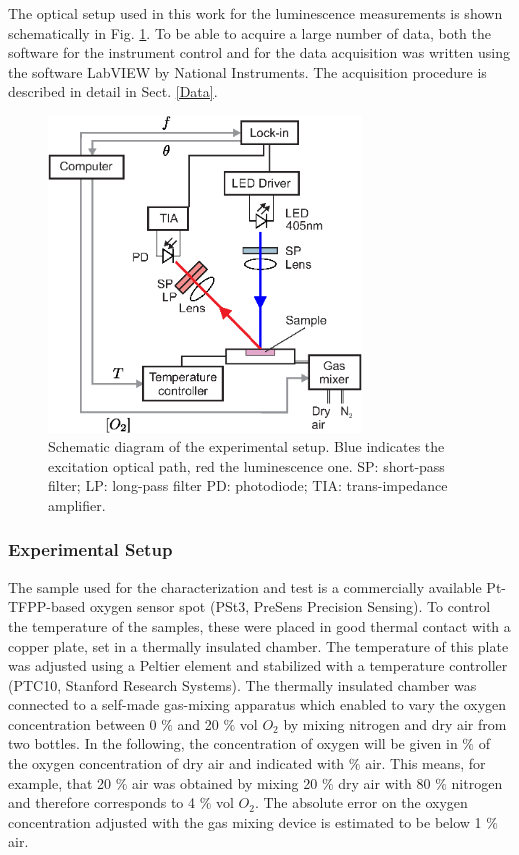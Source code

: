 \documentclass[9pt,twocolumn,twoside,pdftex]{optica}
\begin{document}
The optical setup used in this work for the luminescence measurements is shown schematically in Fig. \ref{fig:setup}. To be able to acquire a large number of data, both the software for the instrument control and for the data acquisition was written using the software LabVIEW by National Instruments. The acquisition procedure is described in detail in Sect. \ref{Data}.

\begin{figure}[t!]
\centering
\includegraphics[keepaspectratio, width=8.3cm]{Setup_auto.eps}
\caption{Schematic diagram of the experimental setup. Blue indicates the excitation optical path, red the luminescence one. SP: short-pass filter; LP: long-pass filter PD: photodiode; TIA: trans-impedance amplifier.}
\label{fig:setup}
\end{figure}


\subsubsection{Experimental Setup}

The sample used for the characterization and test is a commercially available Pt-TFPP-based oxygen sensor spot (PSt3, PreSens Precision Sensing).
To control the temperature of the samples, these were placed in good thermal contact with a copper plate, set in a thermally insulated chamber. The temperature of this plate was adjusted using a Peltier element and stabilized with a temperature controller (PTC10, Stanford Research Systems). The thermally insulated chamber was connected to a self-made gas-mixing apparatus which enabled to vary the oxygen concentration between 0 $\%$ and 20 $\%$ vol $O_2$ by mixing nitrogen and dry air from two bottles. In the following, the concentration of oxygen will be given in $\%$ of the oxygen concentration of dry air and indicated with $\%$ air. This means, for example, that 20 $\%$ air was obtained by mixing 20 $\%$ dry air with 80 $\%$ nitrogen and therefore corresponds to 4 $\%$ vol $O_2$. The absolute error on the oxygen concentration adjusted with the gas mixing device is estimated to be below 1 $\%$ air. 
 
\end{document}
